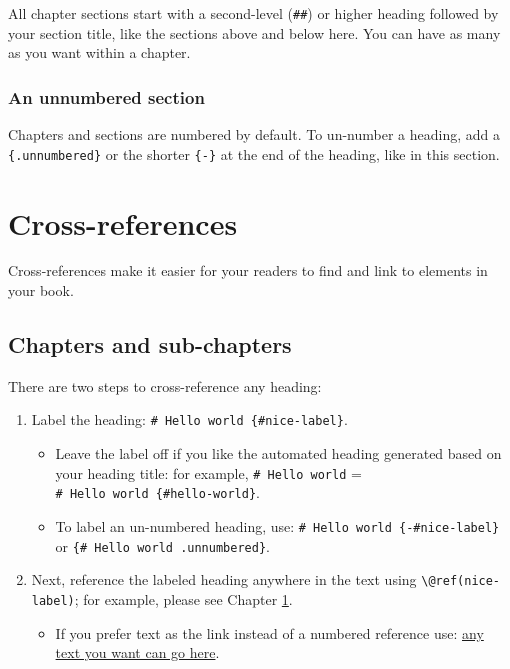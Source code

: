 \documentclass[
]{book}
\providecommand{\tightlist}{%
  \setlength{\itemsep}{0pt}\setlength{\parskip}{0pt}}
\theoremstyle{definition}
\theoremstyle{definition}
\theoremstyle{definition}
\theoremstyle{definition}
\theoremstyle{remark}
\begin{document}
All chapter sections start with a second-level (\texttt{\#\#}) or higher heading followed by your section title, like the sections above and below here. You can have as many as you want within a chapter.

\hypertarget{an-unnumbered-section}{%
\subsubsection*{An unnumbered section}\label{an-unnumbered-section}}

Chapters and sections are numbered by default. To un-number a heading, add a \texttt{\{.unnumbered\}} or the shorter \texttt{\{-\}} at the end of the heading, like in this section.

\hypertarget{cross}{%
\section{Cross-references}\label{cross}}

Cross-references make it easier for your readers to find and link to elements in your book.

\hypertarget{chapters-and-sub-chapters}{%
\subsection{Chapters and sub-chapters}\label{chapters-and-sub-chapters}}

There are two steps to cross-reference any heading:

\begin{enumerate}
\def\labelenumi{\arabic{enumi}.}
\tightlist
\item
  Label the heading: \texttt{\#\ Hello\ world\ \{\#nice-label\}}.

  \begin{itemize}
  \tightlist
  \item
    Leave the label off if you like the automated heading generated based on your heading title: for example, \texttt{\#\ Hello\ world} = \texttt{\#\ Hello\ world\ \{\#hello-world\}}.
  \item
    To label an un-numbered heading, use: \texttt{\#\ Hello\ world\ \{-\#nice-label\}} or \texttt{\{\#\ Hello\ world\ .unnumbered\}}.
  \end{itemize}
\item
  Next, reference the labeled heading anywhere in the text using \texttt{\textbackslash{}@ref(nice-label)}; for example, please see Chapter \ref{cross}.

  \begin{itemize}
  \tightlist
  \item
    If you prefer text as the link instead of a numbered reference use: \protect\hyperlink{cross}{any text you want can go here}.
  \end{itemize}
\end{enumerate}
\end{document}
